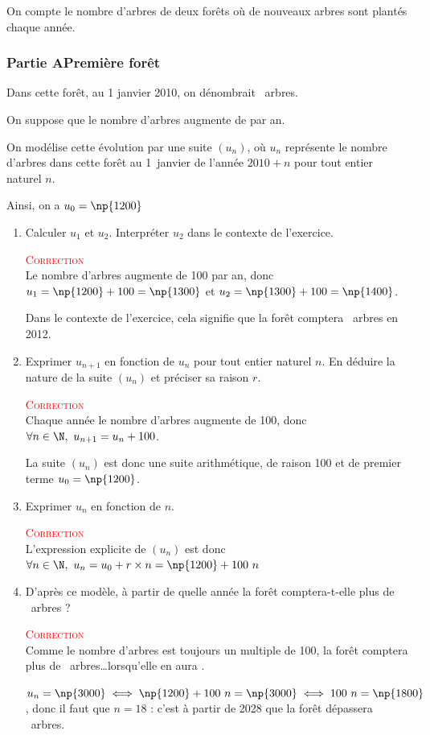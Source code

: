 On compte le nombre d'arbres de deux forêts où de nouveaux arbres sont plantés chaque année.

\subsubsection*{Partie A\hspace{10mm}Première forêt}

Dans cette forêt, au 1 janvier 2010, on dénombrait ~arbres.

On suppose que le nombre d'arbres augmente de  par an.

On modélise cette évolution par une suite \mbox{$(u_n)$}, où $u_n$ représente le nombre d'arbres dans cette forêt au 1~janvier de l'année \mbox{$2010+n$} pour tout entier naturel $n$.

Ainsi, on a \mbox{$u_0=\np{1200}$}
\begin{enumerate}
	\item Calculer $u_1$ et $u_2$. Interpréter $u_2$ dans le contexte de l'exercice.


	\textcolor{red}{\textsc{Correction}}\\
	Le nombre d'arbres augmente de 100 par an, donc \mbox{$u_1=\np{1200}+100=\np{1300}$}  et \mbox{$u_2=\np{1300}+100=\np{1400}$}.

	Dans le contexte de l'exercice, cela signifie que la forêt comptera ~arbres en 2012.
	\item Exprimer \mbox{$u_{n+1}$} en fonction de $u_n$ pour tout entier naturel $n$. En déduire la nature de la suite $(u_n)$ et préciser sa raison $r$.


	\textcolor{red}{\textsc{Correction}}\\
	Chaque année le nombre d'arbres augmente de 100, donc \mbox{$\forall n \in \N,~ u_{n+1}=u_n + 100$}.

	La suite $(u_n)$ est donc une suite arithmétique, de raison 100 et de premier terme \mbox{$u_0=\np{1200}$}.
		\item Exprimer $u_n$ en fonction de $n$.


		\textcolor{red}{\textsc{Correction}}\\
		L'expression explicite de $(u_n)$ est donc  \mbox{$\forall n \in \N,~ u_n=u_0 +r\times n= \np{1200} + 100~n$}
	\item D'après ce modèle, à partir de quelle année la forêt comptera-t-elle plus de ~arbres ?

		\textcolor{red}{\textsc{Correction}}\\
		Comme le nombre d'arbres est toujours un multiple de 100, la forêt comptera plus de ~arbres\dots lorsqu'elle en aura .

		\mbox{$u_n=\np{3000}\iff \np{1200}+100~n=\np{3000}\iff 100~n=\np{1800}$}, donc il faut que \mbox{$n=18$} : c'est à partir de 2028 que la forêt dépassera ~arbres.
\end{enumerate}

